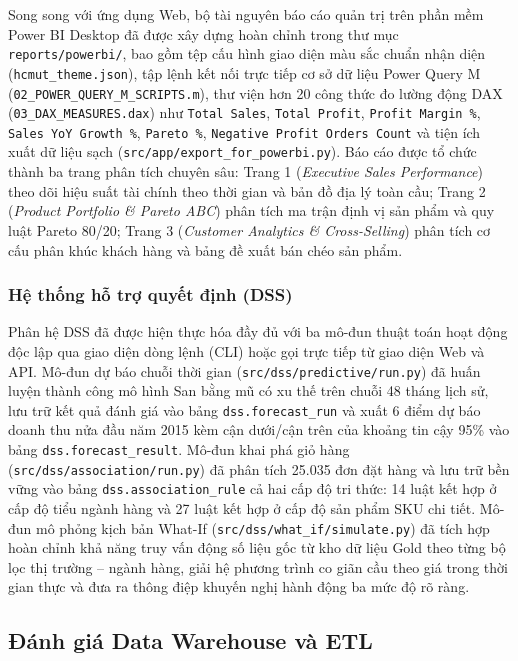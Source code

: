 Song song với ứng dụng Web, bộ tài nguyên báo cáo quản trị trên phần mềm Power BI Desktop đã được xây dựng hoàn chỉnh trong thư mục \texttt{reports/powerbi/}, bao gồm tệp cấu hình giao diện màu sắc chuẩn nhận diện (\texttt{hcmut\_theme.json}), tập lệnh kết nối trực tiếp cơ sở dữ liệu Power Query M (\texttt{02\_POWER\_QUERY\_M\_SCRIPTS.m}), thư viện hơn 20 công thức đo lường động DAX (\texttt{03\_DAX\_MEASURES.dax}) như \texttt{Total Sales}, \texttt{Total Profit}, \texttt{Profit Margin \%}, \texttt{Sales YoY Growth \%}, \texttt{Pareto \%}, \texttt{Negative Profit Orders Count} và tiện ích xuất dữ liệu sạch (\texttt{src/app/export\_for\_powerbi.py}). Báo cáo được tổ chức thành ba trang phân tích chuyên sâu: Trang 1 (\textit{Executive Sales Performance}) theo dõi hiệu suất tài chính theo thời gian và bản đồ địa lý toàn cầu; Trang 2 (\textit{Product Portfolio \& Pareto ABC}) phân tích ma trận định vị sản phẩm và quy luật Pareto 80/20; Trang 3 (\textit{Customer Analytics \& Cross-Selling}) phân tích cơ cấu phân khúc khách hàng và bảng đề xuất bán chéo sản phẩm.

\subsubsection{Hệ thống hỗ trợ quyết định (DSS)}

Phân hệ DSS đã được hiện thực hóa đầy đủ với ba mô-đun thuật toán hoạt động độc lập qua giao diện dòng lệnh (CLI) hoặc gọi trực tiếp từ giao diện Web và API. Mô-đun dự báo chuỗi thời gian (\texttt{src/dss/predictive/run.py}) đã huấn luyện thành công mô hình San bằng mũ có xu thế trên chuỗi 48 tháng lịch sử, lưu trữ kết quả đánh giá vào bảng \texttt{dss.forecast\_run} và xuất 6 điểm dự báo doanh thu nửa đầu năm 2015 kèm cận dưới/cận trên của khoảng tin cậy 95\% vào bảng \texttt{dss.forecast\_result}. Mô-đun khai phá giỏ hàng (\texttt{src/dss/association/run.py}) đã phân tích 25.035 đơn đặt hàng và lưu trữ bền vững vào bảng \texttt{dss.association\_rule} cả hai cấp độ tri thức: 14 luật kết hợp ở cấp độ tiểu ngành hàng và 27 luật kết hợp ở cấp độ sản phẩm SKU chi tiết. Mô-đun mô phỏng kịch bản What-If (\texttt{src/dss/what\_if/simulate.py}) đã tích hợp hoàn chỉnh khả năng truy vấn động số liệu gốc từ kho dữ liệu Gold theo từng bộ lọc thị trường -- ngành hàng, giải hệ phương trình co giãn cầu theo giá trong thời gian thực và đưa ra thông điệp khuyến nghị hành động ba mức độ rõ ràng.

\subsection{Đánh giá Data Warehouse và ETL}

